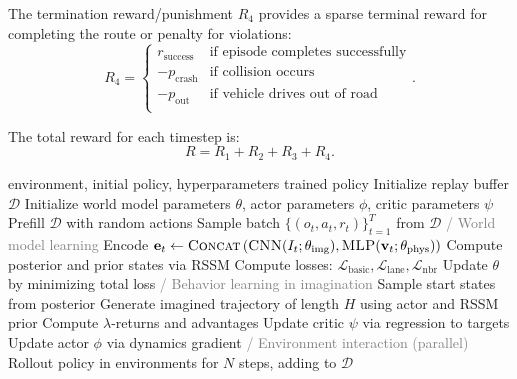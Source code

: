 The termination reward/punishment $R_4$ provides a sparse terminal reward for completing the route or penalty for violations:
\begin{equation}
R_4 = 
\begin{cases}
r_{\text{success}} & \text{if episode completes successfully} \\
-p_{\text{crash}} & \text{if collision occurs} \\
-p_{\text{out}} & \text{if vehicle drives out of road} \\
\end{cases}.
\end{equation}

The total reward for each timestep is:
\begin{equation}
R = R_1 + R_2 + R_3 + R_4.
\end{equation}

\begin{algorithm}[t]
\caption{Kinematics-Aware World Model}
\label{alg:driveworld}
\begin{algorithmic}[1]
\Require environment, initial policy, hyperparameters
\Ensure trained policy
\State Initialize replay buffer $\mathcal{D}$
\State Initialize world model parameters $\theta$, actor parameters $\phi$, critic parameters $\psi$
\State Prefill $\mathcal{D}$ with random actions
    \State Sample batch $\{(o_t, a_t, r_t)\}_{t=1}^{T}$ from $\mathcal{D}$
    \State \textcolor{gray}{\// World model learning}
    \State Encode $\mathbf{e}_t \leftarrow \textsc{Concat}\left(\textsc{CNN}(I_t; \theta_{\text{img}}), \textsc{MLP}(\mathbf{v}_t; \theta_{\text{phys}})\right)$
    \State Compute posterior and prior states via RSSM
    \State Compute losses: $\mathcal{L}_{\text{basic}}, \mathcal{L}_{\text{lane}}, \mathcal{L}_{\text{nbr}}$
    \State Update $\theta$ by minimizing total loss
    \State \textcolor{gray}{\// Behavior learning in imagination}
    \State Sample start states from posterior
    \State Generate imagined trajectory of length $H$ using actor and RSSM prior
    \State Compute $\lambda$-returns and advantages
    \State Update critic $\psi$ via regression to targets
    \State Update actor $\phi$ via dynamics gradient
    \State \textcolor{gray}{\// Environment interaction (parallel)}
    \State Rollout policy in environments for $N$ steps, adding to $\mathcal{D}$
\EndFor
\end{algorithmic}
\end{algorithm}